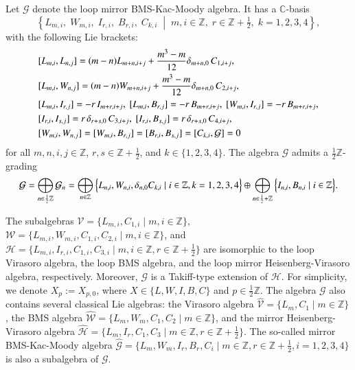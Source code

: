 \documentclass[12pt,reqno]{amsart}
\def\Z{\mathbb{Z}}
\numberwithin{equation}{section}
\begin{document}
Let $\mathcal{G}$ denote the loop mirror BMS-Kac-Moody algebra. It has a $\mathbb{C}$-basis
\[
\left\{ L_{m,i},\; W_{m,i},\; I_{r,i},\; B_{r,i},\; C_{k,i} \;\middle|\; m,i\in \mathbb{Z},\; r\in\mathbb{Z}+\tfrac{1}{2},\; k=1,2,3,4 \right\},
\]
with the following Lie brackets:
\begin{align*}
&[L_{m,i},L_{n,j}]= (m-n)L_{m+n,i+j}+\frac{m^3-m}{12}\delta_{m+n,0}\,C_{1,i+j}, \notag \\
&[L_{m,i},W_{n,j}]=(m-n)W_{m+n,i+j}+\frac{m^3-m}{12}\delta_{m+n,0}\,C_{2,i+j}, \notag \\
&[L_{m,i},I_{r,j}]=-r\,I_{m+r,i+j}, \notag \ 
[L_{m,i},B_{r,j}]=-r\,B_{m+r,i+j}, \notag \ 
[W_{m,i},I_{r,j}]=-r\,B_{m+r,i+j}, \notag \\
&[I_{r,i},I_{s,j}]=r\,\delta_{r+s,0}\,C_{3,i+j}, \notag \ 
[I_{r,i},B_{s,j}]=r\,\delta_{r+s,0}\,C_{4,i+j}, \notag \\
&[W_{m,i},W_{n,j}]=[W_{m,i},B_{r,j}]=[B_{r,i},B_{s,j}]=[C_{k,i},\mathcal{G}]=0
\end{align*}
for all $m,n,i,j\in \mathbb{Z}$, $r,s\in\mathbb{Z}+\frac{1}{2}$, and $k\in\{1,2,3,4\}$. 
The algebra $\mathcal{G}$ admits a $\frac{1}{2}\Z$-grading 
\begin{equation}\label{grading 1.1}
\aligned
\mathcal{G}=\bigoplus_{n\in\frac{1}{2}\Z}\mathcal{G}_n=\bigoplus_{n\in\Z}\Big\{L_{n,i},W_{n,i},\delta_{n,0}C_{k,i}\mid i\in \Z,k=1,2,3,4\Big\}\oplus\bigoplus_{n\in\frac{1}{2}+\Z}\Big\{I_{n,i},B_{n,i}\mid i\in \Z\Big\}.
\endaligned
\end{equation}

The subalgebras $\mathcal{V}=\{L_{m,i}, C_{1,i}\mid m,i\in \mathbb{Z}\}$, $\mathcal{W}=\{L_{m,i},W_{m,i}, C_{1,i},C_{2,i}\mid m,i\in \mathbb{Z}\}$, and $\mathcal{H}=\{L_{m,i}, I_{r,i},C_{1,i},C_{3,i}\mid m,i\in \mathbb{Z}, r\in\mathbb{Z}+\frac{1}{2}\}$ are isomorphic to the loop Virasoro algebra, the loop BMS algebra, and the loop mirror Heisenberg-Virasoro algebra, respectively. Moreover, $\mathcal{G}$ is a Takiff-type extension of $\mathcal{H}$. For simplicity, we denote $X_p:=X_{p,0}$, where $X\in\{L,W,I,B,C\}$ and $p\in\frac{1}{2}\mathbb{Z}$.
The algebra $\mathcal{G}$ also contains several classical Lie algebras: the Virasoro algebra $\hat{\mathcal{V}}=\{L_m, C_1\mid m\in \mathbb{Z}\}$, the BMS algebra $\hat{\mathcal{W}}=\{L_{m},W_m, C_{1},C_2\mid m\in \mathbb{Z}\}$, and the mirror Heisenberg-Virasoro algebra $\hat{\mathcal{H}}=\{L_{m}, I_r,C_{1},C_3\mid m\in \mathbb{Z}, r\in\mathbb{Z}+\frac{1}{2}\}$. The so-called mirror BMS-Kac-Moody algebra $\hat{\mathcal{G}}=\{L_m,W_m,I_r,B_r,C_i\mid m\in\mathbb{Z},r\in\Z+\frac{1}{2},i=1,2,3,4\}$ is also a subalgebra of $\mathcal{G}$.
\end{document}
